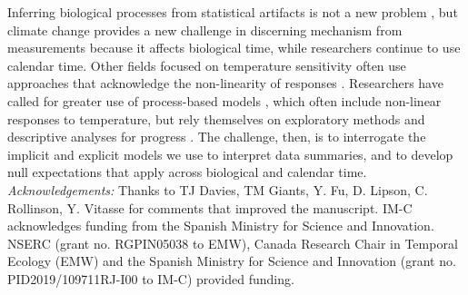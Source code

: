 \documentclass[11pt,letter]{article}
\begin{document}

Inferring biological processes from statistical artifacts is not a new problem \citep[e.g.,][]{nee2005}, but climate change provides a new challenge in discerning mechanism from measurements because it affects biological time, while researchers continue to use calendar time. Other fields focused on temperature sensitivity often use approaches that acknowledge the non-linearity of responses \citep[e.g.,][]{yuste2004}. Researchers have called for greater use of process-based models \citep{keenan2019}, which often include non-linear responses to temperature, but rely themselves on exploratory methods and descriptive analyses for progress \citep{chuine2016}. The challenge, then, is to interrogate the implicit and explicit models we use to interpret data summaries, and to develop null expectations that apply across biological and calendar time. \\



\vspace{5ex}
\emph{Acknowledgements:} Thanks to TJ Davies, TM Giants, Y. Fu, D. Lipson, C. Rollinson, Y. Vitasse for comments that improved the manuscript.  IM-C acknowledges funding from the Spanish Ministry for Science and Innovation. NSERC (grant no. RGPIN­05038 to EMW), Canada Research Chair in Temporal Ecology (EMW) and the Spanish Ministry for Science and Innovation (grant no. PID2019/109711RJ-I00 to IM-C) provided funding. 
\\ %
\end{document}
